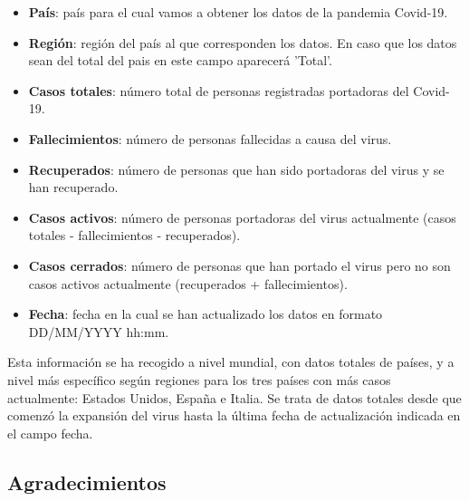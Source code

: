 \documentclass[]{article}
\providecommand{\tightlist}{%
  \setlength{\itemsep}{0pt}\setlength{\parskip}{0pt}}
\begin{document}
\begin{itemize}
\tightlist
\item
  \textbf{País}: país para el cual vamos a obtener los datos de la pandemia Covid-19.\\
\item
  \textbf{Región}: región del país al que corresponden los datos. En caso que los datos sean del total del pais en este campo aparecerá 'Total'.\\
\item
  \textbf{Casos totales}: número total de personas registradas portadoras del Covid-19.\\
\item
  \textbf{Fallecimientos}: número de personas fallecidas a causa del virus.\\
\item
  \textbf{Recuperados}: número de personas que han sido portadoras del virus y se han recuperado. \\
\item
  \textbf{Casos activos}: número de personas portadoras del virus actualmente (casos totales - fallecimientos - recuperados).\\
\item
  \textbf{Casos cerrados}: número de personas que han portado el virus pero no son casos activos actualmente (recuperados + fallecimientos).\\
\item
  \textbf{Fecha}: fecha en la cual se han actualizado los datos en formato DD/MM/YYYY hh:mm.
\end{itemize}

Esta información se ha recogido a nivel mundial, con datos totales de países, y a nivel más específico según regiones para los tres países con más casos actualmente: Estados Unidos, España e Italia. Se trata de datos totales desde que comenzó la expansión del virus hasta la última fecha de actualización indicada en el campo fecha.


\hypertarget{agradecimientos}{%
\subsection{Agradecimientos}\label{agradecimientos}}
\end{document}
